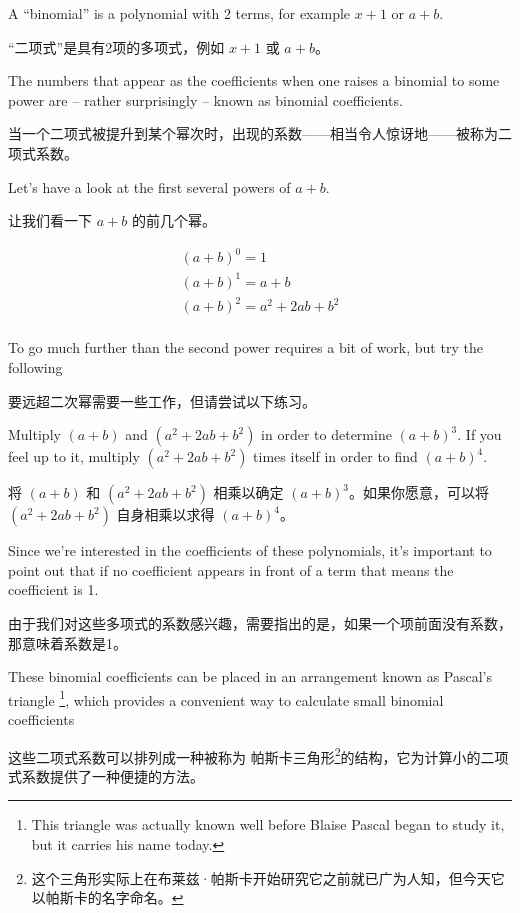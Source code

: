 A ``binomial'' is a polynomial with 2 terms, for example $x+1$ or $a+b$.

“二项式”是具有2项的多项式，例如 $x+1$ 或 $a+b$。

The numbers that appear as the coefficients when one raises a binomial
to some power are -- rather surprisingly -- known as 
 binomial coefficients.

当一个二项式被提升到某个幂次时，出现的系数——相当令人惊讶地——被称为二项式系数。

Let's have a look at the first several powers of $a+b$.

让我们看一下 $a+b$ 的前几个幂。

\begin{gather*}
(a+b)^0 = 1 \\
(a+b)^1 = a+b \\
(a+b)^2 = a^2 + 2ab + b^2 \\
\end{gather*} 

To go much further than the second power requires a bit of work,
but try the following

要远超二次幂需要一些工作，但请尝试以下练习。

\begin{exer}
Multiply $(a+b)$ and $(a^2 + 2ab + b^2)$ in order to determine $(a+b)^3$.
If you feel up to it, multiply $(a^2 + 2ab + b^2)$ times itself in order
to find $(a+b)^4$.
\end{exer}

\begin{exer}
将 $(a+b)$ 和 $(a^2 + 2ab + b^2)$ 相乘以确定 $(a+b)^3$。如果你愿意，可以将 $(a^2 + 2ab + b^2)$ 自身相乘以求得 $(a+b)^4$。
\end{exer}

Since we're interested in the coefficients of these polynomials, it's important
to point out that if no coefficient appears in front of a term that means the
coefficient is 1.

由于我们对这些多项式的系数感兴趣，需要指出的是，如果一个项前面没有系数，那意味着系数是1。

These binomial coefficients can be placed in an arrangement known as
  Pascal's triangle
\footnote{This triangle was actually known well before Blaise Pascal %
began to study it, but it carries his name today.}, which
provides a convenient way to calculate small binomial coefficients

这些二项式系数可以排列成一种被称为 帕斯卡三角形\footnote{这个三角形实际上在布莱兹·帕斯卡开始研究它之前就已广为人知，但今天它以帕斯卡的名字命名。}的结构，它为计算小的二项式系数提供了一种便捷的方法。

